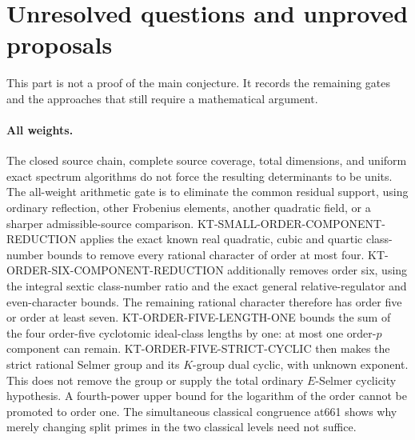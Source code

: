 \section{Unresolved questions and unproved proposals}

This part is not a proof of the main conjecture. It records the
remaining gates and the approaches that still require a
mathematical argument.

\paragraph{All weights.}
The closed source chain, complete source coverage, total
dimensions, and uniform exact spectrum algorithms do not
force the resulting determinants to be units. The all-weight
arithmetic gate is to eliminate the common residual support,
using ordinary reflection, other Frobenius elements, another
quadratic field, or a sharper admissible-source comparison.
KT-SMALL-ORDER-COMPONENT-REDUCTION applies the exact known
real quadratic, cubic and quartic class-number bounds to
remove every rational character of order at most four.
KT-ORDER-SIX-COMPONENT-REDUCTION additionally removes order six,
using the integral sextic class-number ratio and the exact general
relative-regulator and even-character bounds.
The remaining rational character therefore has order five or
order at least seven. KT-ORDER-FIVE-LENGTH-ONE bounds the sum
of the four order-five cyclotomic ideal-class lengths by one:
at most one order-$p$ component can remain.
KT-ORDER-FIVE-STRICT-CYCLIC then makes the strict rational
Selmer group and its $K$-group dual cyclic, with unknown exponent.
This does not remove the group or supply the total ordinary
$E$-Selmer cyclicity hypothesis.
A fourth-power upper bound for the logarithm of the order
cannot be promoted to order one. The simultaneous classical
congruence at661 shows why merely changing split primes in
the two classical levels need not suffice.

